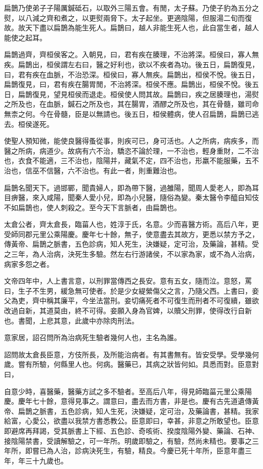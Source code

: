 扁鵲乃使弟子子陽厲鍼砥石，以取外三陽五會。有閒，太子蘇。乃使子豹為五分之熨，以八減之齊和煮之，以更熨兩脅下。太子起坐。更適陰陽，但服湯二旬而復故。故天下盡以扁鵲為能生死人。扁鵲曰，越人非能生死人也，此自當生者，越人能使之起耳。

扁鵲過齊，齊桓侯客之。入朝見，曰，君有疾在腠理，不治將深。桓侯曰，寡人無疾。扁鵲出，桓侯謂左右曰，醫之好利也，欲以不疾者為功。後五日，扁鵲復見，曰，君有疾在血脈，不治恐深。桓侯曰，寡人無疾。扁鵲出，桓侯不悅。後五日，扁鵲復見，曰，君有疾在腸胃閒，不治將深。桓侯不應。扁鵲出，桓侯不悅。後五日，扁鵲復見，望見桓侯而退走。桓侯使人問其故。扁鵲曰，疾之居腠理也，湯熨之所及也，在血脈，鍼石之所及也，其在腸胃，酒醪之所及也，其在骨髓，雖司命無柰之何。今在骨髓，臣是以無請也。後五日，桓侯體病，使人召扁鵲，扁鵲已逃去。桓侯遂死。

使聖人預知微，能使良醫得蚤從事，則疾可已，身可活也。人之所病，病疾多，而醫之所病，病道少。故病有六不治，驕恣不論於理，一不治也，輕身重財，二不治也，衣食不能適，三不治也，陰陽并，藏氣不定，四不治也，形羸不能服藥，五不治也，信巫不信醫，六不治也。有此一者，則重難治也。

扁鵲名聞天下。過邯鄲，聞貴婦人，即為帶下醫，過雒陽，聞周人愛老人，即為耳目痹醫，來入咸陽，聞秦人愛小兒，即為小兒醫，隨俗為變。秦太醫令李醯自知伎不如扁鵲也，使人刺殺之。至今天下言脈者，由扁鵲也。

太倉公者，齊太倉長，臨菑人也，姓淳于氏，名意。少而喜醫方術。高后八年，更受師同郡元里公乘陽慶。慶年七十餘，無子，使意盡去其故方，更悉以禁方予之，傳黃帝、扁鵲之脈書，五色診病，知人死生，決嫌疑，定可治，及藥論，甚精。受之三年，為人治病，決死生多驗。然左右行游諸侯，不以家為家，或不為人治病，病家多怨之者。

文帝四年中，人上書言意，以刑罪當傳西之長安。意有五女，隨而泣。意怒，罵曰，生子不生男，緩急無可使者。於是少女緹縈傷父之言，乃隨父西。上書曰，妾父為吏，齊中稱其廉平，今坐法當刑。妾切痛死者不可復生而刑者不可復續，雖欲改過自新，其道莫由，終不可得。妾願入身為官婢，以贖父刑罪，使得改行自新也。書聞，上悲其意，此歲中亦除肉刑法。

意家居，詔召問所為治病死生驗者幾何人也，主名為誰。

詔問故太倉長臣意，方伎所長，及所能治病者。有其書無有。皆安受學。受學幾何歲。嘗有所驗，何縣里人也。何病。醫藥已，其病之狀皆何如。具悉而對。臣意對曰，

自意少時，喜醫藥，醫藥方試之多不驗者。至高后八年，得見師臨菑元里公乘陽慶。慶年七十餘，意得見事之。謂意曰，盡去而方書，非是也。慶有古先道遺傳黃帝、扁鵲之脈書，五色診病，知人生死，決嫌疑，定可治，及藥論書，甚精。我家給富，心愛公，欲盡以我禁方書悉教公。臣意即曰，幸甚，非意之所敢望也。臣意即避席再拜謁，受其脈書上下經、五色診、奇咳術、揆度陰陽外變、藥論、石神、接陰陽禁書，受讀解驗之，可一年所。明歲即驗之，有驗，然尚未精也。要事之三年所，即嘗已為人治，診病決死生，有驗，精良。今慶已死十年所，臣意年盡三年，年三十九歲也。

